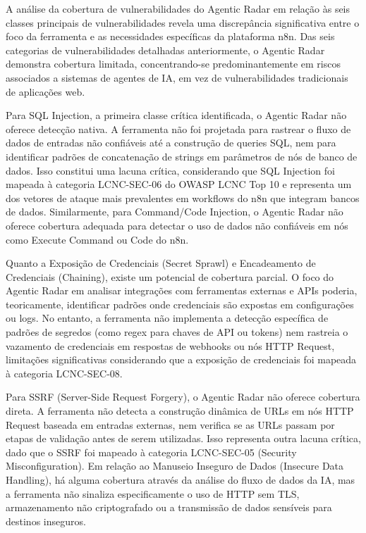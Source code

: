 \documentclass{sftex}
\begin{document}
A análise da cobertura de vulnerabilidades do Agentic Radar em relação às seis classes principais de vulnerabilidades revela uma discrepância significativa entre o foco da ferramenta e as necessidades específicas da plataforma n8n. Das seis categorias de vulnerabilidades detalhadas anteriormente, o Agentic Radar demonstra cobertura limitada, concentrando-se predominantemente em riscos associados a sistemas de agentes de IA, em vez de vulnerabilidades tradicionais de aplicações web.

Para SQL Injection, a primeira classe crítica identificada, o Agentic Radar não oferece detecção nativa. A ferramenta não foi projetada para rastrear o fluxo de dados de entradas não confiáveis até a construção de queries SQL, nem para identificar padrões de concatenação de strings em parâmetros de nós de banco de dados. Isso constitui uma lacuna crítica, considerando que SQL Injection foi mapeada à categoria LCNC-SEC-06 do OWASP LCNC Top 10 e representa um dos vetores de ataque mais prevalentes em workflows do n8n que integram bancos de dados. Similarmente, para Command/Code Injection, o Agentic Radar não oferece cobertura adequada para detectar o uso de dados não confiáveis em nós como Execute Command ou Code do n8n.

Quanto a Exposição de Credenciais (Secret Sprawl) e Encadeamento de Credenciais (Chaining), existe um potencial de cobertura parcial. O foco do Agentic Radar em analisar integrações com ferramentas externas e APIs poderia, teoricamente, identificar padrões onde credenciais são expostas em configurações ou logs. No entanto, a ferramenta não implementa a detecção específica de padrões de segredos (como regex para chaves de API ou tokens) nem rastreia o vazamento de credenciais em respostas de webhooks ou nós HTTP Request, limitações significativas considerando que a exposição de credenciais foi mapeada à categoria LCNC-SEC-08.

Para SSRF (Server-Side Request Forgery), o Agentic Radar não oferece cobertura direta. A ferramenta não detecta a construção dinâmica de URLs em nós HTTP Request baseada em entradas externas, nem verifica se as URLs passam por etapas de validação antes de serem utilizadas. Isso representa outra lacuna crítica, dado que o SSRF foi mapeado à categoria LCNC-SEC-05 (Security Misconfiguration). Em relação ao Manuseio Inseguro de Dados (Insecure Data Handling), há alguma cobertura através da análise do fluxo de dados da IA, mas a ferramenta não sinaliza especificamente o uso de HTTP sem TLS, armazenamento não criptografado ou a transmissão de dados sensíveis para destinos inseguros.
\end{document}

